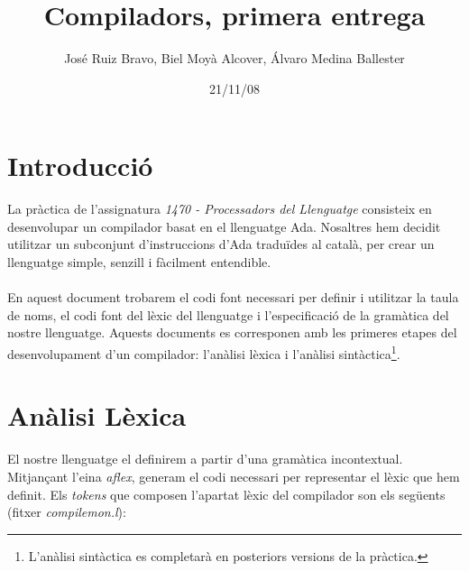 \documentclass[10pt]{article}
\title{Compiladors, primera entrega}
\author{José Ruiz Bravo, Biel Moyà Alcover, Álvaro Medina Ballester}
\date{21/11/08}
\begin{document}
	\maketitle
	\section{Introducció}
		La pràctica de l'assignatura \textit{1470 - Processadors del Llenguatge} consisteix en
		desenvolupar un compilador basat en el llenguatge Ada. Nosaltres hem decidit 
		utilitzar un subconjunt d'instruccions d'Ada traduïdes al català, per crear
		un llenguatge simple, senzill i fàcilment entendible.
		\\
		\\
		En aquest document trobarem el codi font necessari per definir i utilitzar la
		taula de noms, el codi font del lèxic del llenguatge i l'especificació de la
		gramàtica del nostre llenguatge. Aquests documents es corresponen amb les primeres
		etapes del desenvolupament d'un compilador: l'anàlisi lèxica i l'anàlisi 			sintàctica\footnote{L'anàlisi sintàctica es completarà en posteriors versions de la 			pràctica.}.
	\newpage
	\section{Anàlisi Lèxica}
		El nostre llenguatge el definirem a partir d'una gramàtica incontextual. Mitjançant l'eina \textit{aflex}, generam el codi necessari per representar el lèxic que hem definit. Els \textit{tokens} que composen l'apartat lèxic del compilador son els següents (fitxer \textit{compilemon.l}):
		\\
	
\end{document}
